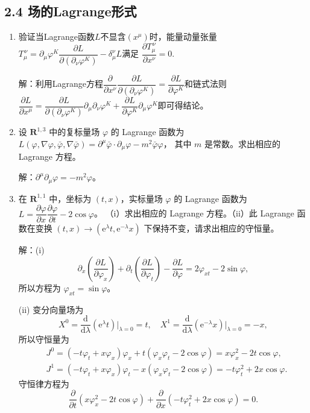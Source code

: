 \subsection{2.4 场的Lagrange形式}
\begin{enumerate}
\item 验证当Lagrange函数$L$不显含$(x^{\mu})$时，能量动量张量$T_{\mu}^{\, \nu}=
\partial_{\mu}\varphi^{K}\dfrac{\partial L}{\partial(\partial_{\nu}\varphi^{K})}-\delta_{\mu}^{\nu}L$满足
$\dfrac{\partial T_{\mu}^{\, \nu}}{\partial x^{\nu}}=0$.

解：利用Lagrange方程$\dfrac{\partial}{\partial x^{\nu}}\dfrac{\partial L}{\partial(\partial_{\nu}\varphi^{K})}=
\dfrac{\partial L}{\partial\varphi^{K}}$和链式法则$\dfrac{\partial L}{\partial x^{\mu}}=
\dfrac{\partial L}{\partial(\partial_{\nu}\varphi^{K})}\partial_{\mu}\partial_{\nu}\varphi^{K}+
\dfrac{\partial L}{\partial \varphi^{K}}\partial_{\mu}\varphi^{K}$即可得结论。

\item 设 $\mathbf{R}^{1,3}$ 中的复标量场 $\varphi$ 的 Lagrange 函数为 
$L(\varphi, \nabla \varphi, \bar{\varphi}, \nabla \bar{\varphi})
=\partial^\mu \bar{\varphi} \cdot \partial_\mu \varphi-m^2 \bar{\varphi} \varphi$，
其中 $m$ 是常数。求出相应的 Lagrange 方程。

解：$\partial^{\mu} \partial_{\mu} \varphi=-m^{2} \varphi$。

\item 在 $\mathbf{R}^{1,1}$ 中，坐标为 $(t, x)$，实标量场 $\varphi$ 的 Lagrange 函数为 
$L=\dfrac{\partial \varphi}{\partial x}\dfrac{\partial \varphi}{\partial t}-2 \cos \varphi$。
（i）求出相应的 Lagrange 方程。（ii）此 Lagrange 函数在变换 $(t, x) \rightarrow (\mathrm{e}^{\lambda}t, \mathrm{e}^{-\lambda}x)$ 下保持不变，请求出相应的守恒量。

解：(i)
$$\partial_{x}\left(\frac{\partial L}{\partial \varphi_{x}}\right)
+\partial_{t}\left(\frac{\partial L}{\partial \varphi_{t}}\right)
-\frac{\partial L}{\partial \varphi}=2\varphi_{xt}-2\sin\varphi,$$
所以方程为 $\varphi_{xt}=\sin\varphi$。

(ii) 变分向量场为
\[X^{0}=\frac{\mathrm{d}}{\mathrm{d} \lambda}(\mathrm{e}^{\lambda} t)\bigg|_{\lambda=0}=t, 
\quad X^{1}=\frac{\mathrm{d}}{\mathrm{d} \lambda}(\mathrm{e}^{-\lambda} x)\bigg|_{\lambda=0}=-x,\]
所以守恒量为
\begin{align*}
& J^{0}=(-t\varphi_{t}+x\varphi_{x})\varphi_{x}+t(\varphi_{x}\varphi_{t}-2\cos\varphi)=x\varphi_{x}^{2}-2t\cos\varphi, \\
& J^{1}=(-t\varphi_{t}+x\varphi_{x})\varphi_{t}-x(\varphi_{x}\varphi_{t}-2\cos\varphi)=-t\varphi_{t}^{2}+2x\cos\varphi.
\end{align*}
守恒律方程为
$$\frac{\partial}{\partial t}(x\varphi_{x}^{2}-2t\cos\varphi)
+\frac{\partial}{\partial x}(-t\varphi_{t}^{2}+2x\cos\varphi)=0.$$


\end{enumerate}
